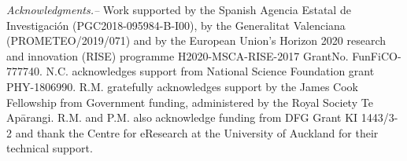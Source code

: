 \documentclass[aps, twocolumn, superscriptaddress, showpacs, nofootinbib, longbibliography]{revtex4-1}
\begin{document}
\begin{abstract}
  
\end{abstract}

\maketitle

\bigskip

\bigskip

\bigskip

\bigskip

\bigskip


\bigskip\noindent\textit{Acknowledgments.--} Work supported by the Spanish Agencia Estatal de Investigaci\'on (PGC2018-095984-B-I00), by the Generalitat Valenciana (PROMETEO/2019/071) and by the European Union’s Horizon 2020 research and innovation (RISE) programme H2020-MSCA-RISE-2017 GrantNo. FunFiCO-777740.
N.C. acknowledges support from National Science Foundation grant PHY-1806990.
R.M. gratefully acknowledges support by the James Cook Fellowship from Government funding, administered by the Royal Society Te  Ap\={a}rangi. R.M. and P.M. also acknowledge funding from  DFG Grant KI 1443/3-2 and thank the Centre for eResearch at the University of Auckland for their technical support.
\begin{appendices}

\end{appendices}
%

\end{document}
